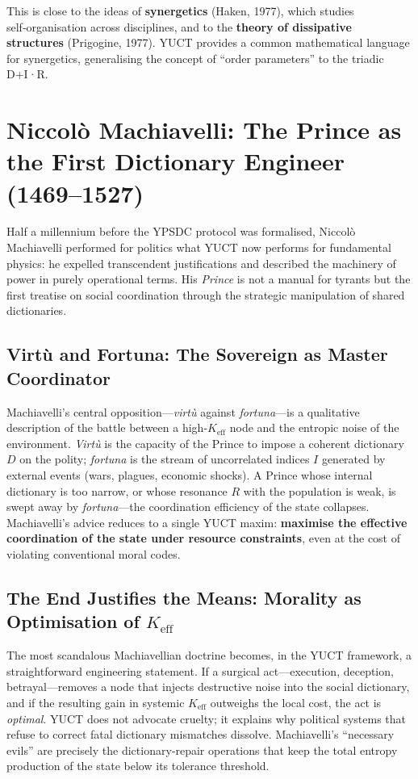 \documentclass[12pt,a4paper]{article}
\begin{document}
	This is close to the ideas of \textbf{synergetics} (Haken, 1977), which studies self‑organisation across disciplines, and to the \textbf{theory of dissipative structures} (Prigogine, 1977). YUCT provides a common mathematical language for synergetics, generalising the concept of “order parameters” to the triadic D+I·R.
	
	\section{Niccolò Machiavelli: The Prince as the First Dictionary Engineer (1469--1527)}
	\label{sec:machiavelli}
	
	Half a millennium before the YPSDC protocol was formalised, Niccolò Machiavelli performed for politics what YUCT now performs for fundamental physics: he expelled transcendent justifications and described the machinery of power in purely operational terms. His \emph{Prince} is not a manual for tyrants but the first treatise on social coordination through the strategic manipulation of shared dictionaries.
	
	\subsection{Virtù and Fortuna: The Sovereign as Master Coordinator}
	
	Machiavelli’s central opposition---\emph{virtù} against \emph{fortuna}---is a qualitative description of the battle between a high‑\(K_{\mathrm{eff}}\) node and the entropic noise of the environment. \emph{Virtù} is the capacity of the Prince to impose a coherent dictionary \(D\) on the polity; \emph{fortuna} is the stream of uncorrelated indices \(I\) generated by external events (wars, plagues, economic shocks). A Prince whose internal dictionary is too narrow, or whose resonance \(R\) with the population is weak, is swept away by \emph{fortuna}---the coordination efficiency of the state collapses. Machiavelli’s advice reduces to a single YUCT maxim: \textbf{maximise the effective coordination of the state under resource constraints}, even at the cost of violating conventional moral codes.
	
	\subsection{The End Justifies the Means: Morality as Optimisation of \(K_{\mathrm{eff}}\)}
	
	The most scandalous Machiavellian doctrine becomes, in the YUCT framework, a straightforward engineering statement. If a surgical act---execution, deception, betrayal---removes a node that injects destructive noise into the social dictionary, and if the resulting gain in systemic \(K_{\mathrm{eff}}\) outweighs the local cost, the act is \emph{optimal}. YUCT does not advocate cruelty; it explains why political systems that refuse to correct fatal dictionary mismatches dissolve. Machiavelli’s ``necessary evils'' are precisely the dictionary‑repair operations that keep the total entropy production of the state below its tolerance threshold.
	
\end{document}
